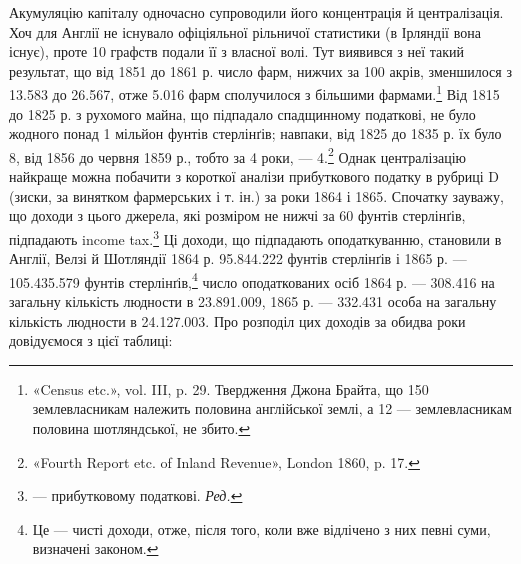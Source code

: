 Акумуляцію капіталу одночасно супроводили його концентрація
й централізація. Хоч для Англії не існувало офіціяльної
рільничої статистики (в Ірляндії вона існує), проте 10 графств подали
її з власної волі. Тут виявився з неї такий результат, що від
1851 до 1861 р. число фарм, нижчих за 100 акрів, зменшилося з
13.583 до 26.567, отже 5.016 фарм сполучилося з більшими фармами.\footnote{
«Census etc.», vol. III, p. 29. Твердження Джона Брайта, що 150
землевласникам належить половина англійської землі, а 12 — землевласникам
половина шотляндської, не збито.
}  Від 1815 до 1825 р. з рухомого майна, що підпадало спадщинному
податкові, не було жодного понад 1 мільйон фунтів стерлінґів;
навпаки, від 1825 до 1835 р. їх було 8, від 1856 до червня
1859 р., тобто за 4 роки, — 4.\footnote{
«Fourth Report etc. of Inland Revenue», London 1860, p. 17.
} Однак централізацію найкраще
можна побачити з короткої аналізи прибуткового податку
в рубриці D (зиски, за винятком фармерських і т. ін.) за роки
1864 і 1865. Спочатку зауважу, що доходи з цього джерела,
які розміром не нижчі за 60 фунтів стерлінґів, підпадають
income tax.\footnote*{
— прибутковому податкові. \emph{Ред.}
} Ці доходи, що підпадають оподаткуванню, становили
в Англії, Велзі й Шотляндії 1864 р. 95.844.222 фунтів стерлінґів
і 1865 р. — 105.435.579 фунтів стерлінґів,\footnote{
Це — чисті доходи, отже, після того, коли вже відлічено з них
певні суми, визначені законом.
} число оподаткованих
осіб 1864 р. — 308.416 на загальну кількість людности в
23.891.009, 1865 р. — 332.431 особа на загальну кількість людности
в 24.127.003. Про розподіл цих доходів за обидва роки
довідуємося з цієї таблиці:
